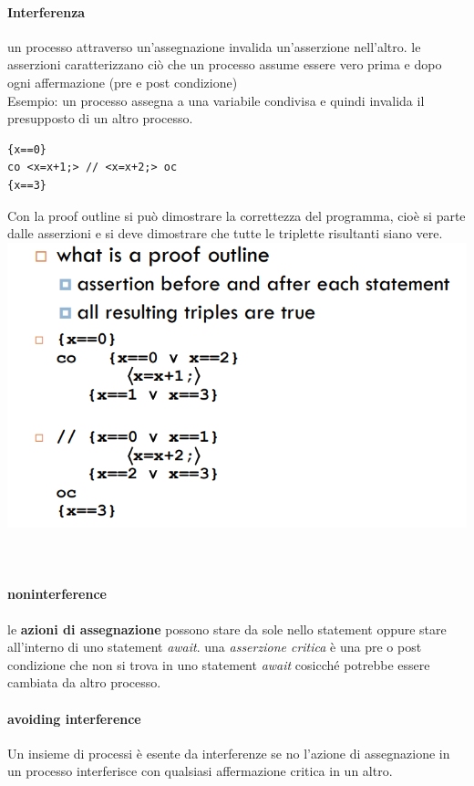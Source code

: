 \documentclass[10pt,a4paper]{article}
\begin{document}
\paragraph{Interferenza} un processo attraverso un'assegnazione invalida un'asserzione nell'altro.
le asserzioni caratterizzano ciò che un processo assume essere vero prima e dopo ogni affermazione (pre e post condizione)\\
Esempio: un processo assegna a una variabile condivisa e quindi invalida il presupposto di un altro processo.
\begin{verbatim}
{x==0}
co <x=x+1;> // <x=x+2;> oc
{x==3}
\end{verbatim}

Con la proof outline si può dimostrare la correttezza del programma, cioè si parte dalle asserzioni e si deve dimostrare che tutte le triplette risultanti siano vere.
\includegraphics[scale=0.45]{img/proof.png} \\ \\ \\

\paragraph{noninterference}
le \textbf{azioni di assegnazione} possono stare da sole nello statement oppure stare all'interno di uno statement \textit{await}.
una \textit{asserzione critica} è una pre o post condizione che non si trova in uno statement \textit{await} cosicché potrebbe essere cambiata da altro processo.

\paragraph{avoiding interference}
Un insieme di processi è esente da interferenze se no l'azione di assegnazione in un processo interferisce con qualsiasi affermazione critica in un altro.
\end{document}
